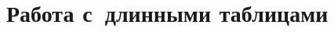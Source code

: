 \appendix
\renewcommand*{\printchaptername}{\chapnamefont \appendixname}
\setlength{\midchapskip}{6pt}
\renewcommand*{\afterchapternum}{\par\nobreak\vskip \midchapskip}
\renewcommand\thechapter{\Asbuk{chapter}}


\chapter{Работа с~длинными таблицами}\label{app:B}

